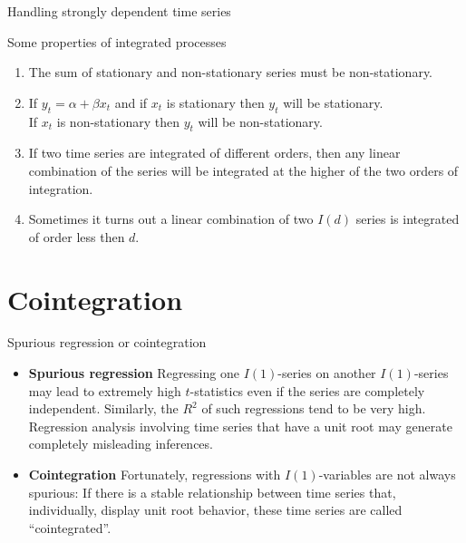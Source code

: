 \documentclass[usenames,dvipsnames]{beamer}
\begin{document}

\begin{frame}{Handling strongly dependent time series}

Some properties of integrated processes
\vspace{0.5cm}
\begin{enumerate}
\item The sum of stationary and non-stationary series must be non-stationary.
\item If $y_t=\alpha + \beta x_t$ and if $x_t$ is stationary then $y_t$ will be stationary. \\
If $x_t$ is non-stationary then $y_t$ will be non-stationary. 
\item If two time series are integrated of different orders, then any linear combination of the series will be integrated at the higher of the two orders of integration. 
\item Sometimes it turns out a linear combination of two $I(d)$ series is integrated of order less then $d$. 
\end{enumerate}
\end{frame}

\section{Cointegration}

\begin{frame}{Spurious regression or cointegration}
\begin{itemize}
\item \textbf{Spurious regression}
 Regressing one $I(1)$-series on another $I(1)$-series may lead to extremely
high $t$-statistics even if the series are completely independent. Similarly, the $R^2$ of such regressions tend to be very high. \\Regression analysis involving time series that have a unit root may generate completely misleading inferences.
\vspace{0.5cm}
\item \textbf{Cointegration} Fortunately, regressions with $I(1)$-variables are not always spurious:
If there is a stable relationship between time series that, individually, display unit root behavior, these time series are called ``cointegrated''.
\end{itemize}
\end{frame}

\end{document}
